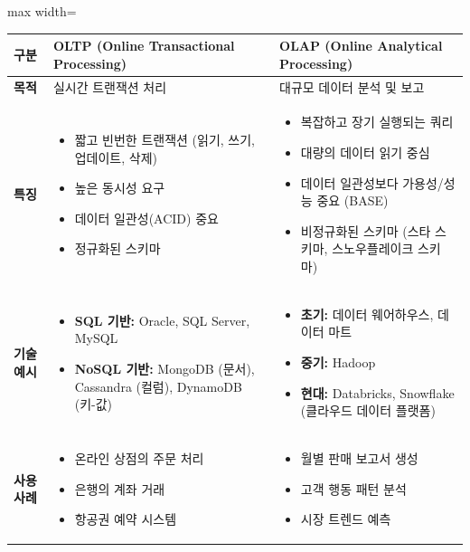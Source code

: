 \documentclass[11pt,a4paper]{article}
\begin{document}
\begin{adjustbox}{max width=\textwidth}
\begin{tabular}{lll}
\toprule
\textbf{구분} & \textbf{OLTP (Online Transactional Processing)} & \textbf{OLAP (Online Analytical Processing)} \\
\midrule
\textbf{목적} & 실시간 트랜잭션 처리 & 대규모 데이터 분석 및 보고 \\
\textbf{특징} &
\begin{itemize}
    \item 짧고 빈번한 트랜잭션 (읽기, 쓰기, 업데이트, 삭제)
    \item 높은 동시성 요구
    \item 데이터 일관성(ACID) 중요
    \item 정규화된 스키마
\end{itemize} &
\begin{itemize}
    \item 복잡하고 장기 실행되는 쿼리
    \item 대량의 데이터 읽기 중심
    \item 데이터 일관성보다 가용성/성능 중요 (BASE)
    \item 비정규화된 스키마 (스타 스키마, 스노우플레이크 스키마)
\end{itemize} \\
\textbf{기술 예시} &
\begin{itemize}
    \item \textbf{SQL 기반:} Oracle, SQL Server, MySQL
    \item \textbf{NoSQL 기반:} MongoDB (문서), Cassandra (컬럼), DynamoDB (키-값)
\end{itemize} &
\begin{itemize}
    \item \textbf{초기:} 데이터 웨어하우스, 데이터 마트
    \item \textbf{중기:} Hadoop
    \item \textbf{현대:} Databricks, Snowflake (클라우드 데이터 플랫폼)
\end{itemize} \\
\textbf{사용 사례} &
\begin{itemize}
    \item 온라인 상점의 주문 처리
    \item 은행의 계좌 거래
    \item 항공권 예약 시스템
\end{itemize} &
\begin{itemize}
    \item 월별 판매 보고서 생성
    \item 고객 행동 패턴 분석
    \item 시장 트렌드 예측
\end{itemize} \\
\bottomrule
\end{tabular}
\end{adjustbox}
\end{document}

